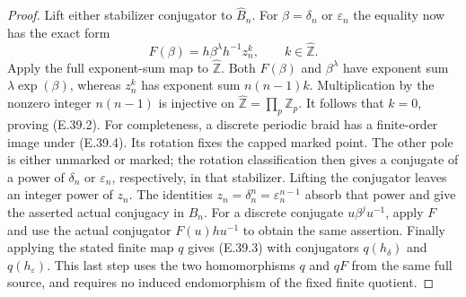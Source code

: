 \begin{proof}
Lift either stabilizer conjugator to $\widehat B_n$.
For $\beta=\delta_n$ or $\varepsilon_n$ the equality
now has the exact form
\[
 F(\beta)=h\beta^\lambda h^{-1}z_n^k,
                         \qquad k\in\widehat{\mathbb Z}.
 \tag{E.39.7}
\]
Apply the full exponent-sum map to
$\widehat{\mathbb Z}$.  Both $F(\beta)$ and
$\beta^\lambda$ have exponent sum
$\lambda\operatorname{exp}(\beta)$, whereas
$z_n^k$ has exponent sum $n(n-1)k$.
Multiplication by the nonzero integer $n(n-1)$
is injective on
$\widehat{\mathbb Z}=\prod_p\mathbb Z_p$.
It follows that $k=0$, proving \textup{(E.39.2)}.
For completeness, a discrete periodic braid has a finite-order
image under \textup{(E.39.4)}.  Its rotation fixes the capped
marked point.  The other pole is either unmarked or marked;
the rotation classification then gives a conjugate of a power
of $\delta_n$ or $\varepsilon_n$, respectively, in that
stabilizer.  Lifting the conjugator leaves an integer power
of $z_n$.  The identities $z_n=\delta_n^n
=\varepsilon_n^{n-1}$ absorb that power and give the asserted
actual conjugacy in $B_n$.
For a discrete conjugate $u\beta^j u^{-1}$,
apply $F$ and use the actual conjugator
$F(u)hu^{-1}$ to obtain the same assertion.
Finally applying the stated finite map $q$ gives
\textup{(E.39.3)} with conjugators $q(h_\delta)$
and $q(h_\varepsilon)$.  This last step uses
the two homomorphisms $q$ and $qF$ from the
same full source, and requires no induced
endomorphism of the fixed finite quotient.
\end{proof}

